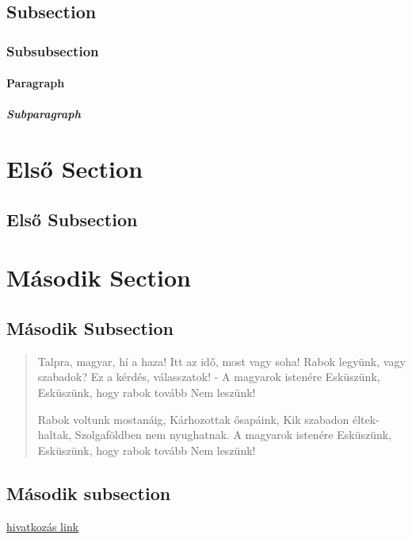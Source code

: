 \documentclass[12pt,twoside]{article}
\begin{document}
\subsection{Subsection}
\subsubsection{Subsubsection}
\paragraph{Paragraph}
\label{s:masodik}
\subparagraph{Subparagraph}

\appendix
\section{Első Section}
\subsection{Első Subsection}
\quote{\hulipsum[2]}
\label{s:harmadik}
\section{Második Section}
\subsection{Második Subsection}
\quotation{\blindtext[2]}
\clearpage
\begin{verse}
Talpra, magyar, hí a haza!
Itt az idő, most vagy soha!
Rabok legyünk, vagy szabadok?
Ez a kérdés, válasszatok! -
A magyarok istenére
Esküszünk,
Esküszünk, hogy rabok tovább
Nem leszünk!

Rabok voltunk mostanáig,
Kárhozottak ősapáink,
Kik szabadon éltek-haltak,
Szolgaföldben nem nyughatnak.
A magyarok istenére
Esküszünk,
Esküszünk, hogy rabok tovább
Nem leszünk!


\end{verse}
\subsection{Második subsection}
\href{https://www.uni-miskolc.hu/~viktoria.vadon/}{hivatkozás link}
\end{document}
